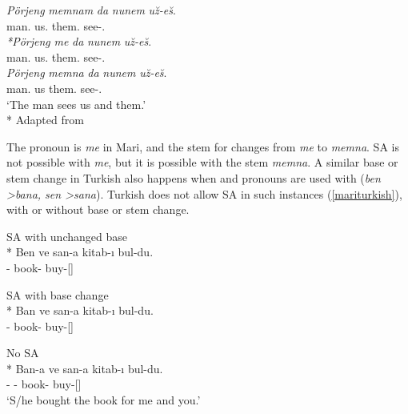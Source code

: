 \begin{exe}
 \ex \label{mariSA3}
    \begin{xlist}
        \ex \label{mariSA3a}
        \gll 
        \textit{Pörjeng} \textit{memnam} \textit{da} \textit{nunem} \textit{u\u{z}-e\u{s}}. \\ man.{\Nom} us.{\Acc} {\And} them.{\Acc} see-{\Tsg}.{\Prs} \\
        
        \ex \label{mariSA3c}
        \gll 
        \textit{*Pörjeng} \textit{me} \textit{da} \textit{nunem} \textit{u\u{z}-e\u{s}}. \\ man.{\Nom} us.{\Acc} {\And} them.{\Acc} see-{\Tsg}.{\Prs} \\
        
        \ex \label{mariSA3b} 
        \gll
        \textit{Pörjeng} \textit{memna} \textit{da} \textit{nunem} \textit{u\u{z}-e\u{s}}. \\ man.{\Nom} us {\And} them.{\Acc} see-{\Tsg}.{\Prs} \\
        \glt `The man sees us and them.'\\*
        \hfill Adapted from \citet{guseva2017postsyntactic}
    \end{xlist}
\end{exe}

The {\Fpl} pronoun is \textit{me} in Mari, and the stem for {\Acc} changes from \textit{me} to \textit{memna}. SA is not possible with \textit{me}, but it is possible with the stem \textit{memna}. A similar base or stem change in Turkish also happens when {\Fsg} and {\Ssg} pronouns are used with {\Dat} (\textit{ben \textgreater bana, sen \textgreater sana}). Turkish does not allow SA in such instances (\ref{mariturkish}), with or without base or stem change.

\begin{exe}
    \ex \label{mariturkish}
    \begin{xlist}
        \ex SA with unchanged base\\*
        \gll *Ben ve san-a kitab-ı bul-du. \\ 
        {\Fsg} {\And}  {\Ssg}-{\Dat} book-{\Acc} buy-{\Pst}[{\Tsg}] \\
        \glt ${}$
        
        \ex SA with base change\\*
        \gll *Ban ve san-a kitab-ı bul-du. \\ 
        {\Fsg} {\And}  {\Ssg}-{\Dat} book-{\Acc} buy-{\Pst}[{\Tsg}] \\
        \glt ${}$
        
        \ex No SA\\*
        \gll Ban-a ve san-a kitab-ı bul-du. \\ 
        {\Fsg}-{\Dat} {\And}  {\Ssg}-{\Dat} book-{\Acc} buy-{\Pst}[{\Tsg}] \\
        \glt `S/he bought the book for me and you.'
    \end{xlist}
\end{exe}

